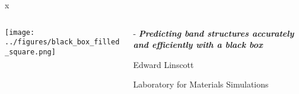 \documentclass[xcolor=table,aspectratio=169]{beamer}
\begin{document}
\begin{frame}{x}
  \begin{columns}
    \begin{column}{\paperheight}
      \texttt{[image: ../figures/black\_box\_filled\_square.png]}
    \end{column}
    \begin{column}{\dimexpr\paperwidth-\paperheight}
      \vfill
      \bf
      \Large
      \emph{Predicting band structures accurately and efficiently with a black box}

      \vspace{0.5em}
      \normalsize
      Edward Linscott
      
      \footnotesize
      Laboratory for Materials Simulations
      \vfill
    \end{column}
  \end{columns}
\end{frame}
\end{document}

